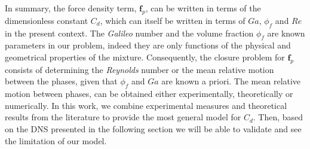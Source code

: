 In summary, the force density term, $\textbf{f}_p$, can be written in terms of the dimensionless constant $C_d$, which can itself be written in terms of $Ga$, $\phi_f$ and $Re$ in the present context. 
The \textit{Galileo} number and the volume fraction $\phi_f$ are known parameters in our problem, indeed they are only functions of the physical and geometrical properties of the mixture.
Consequently, the closure problem for $\textbf{f}_p$ consists of determining the \textit{Reynolds} number or the mean relative motion between the phases, given that $\phi_f$ and $Ga$ are known a priori. 
The mean relative motion between phases, can be obtained either experimentally, theoretically or numerically. 
In this work, we combine experimental measures and theoretical results from the literature to provide the most general model for $C_d$.
Then, based on the DNS presented in the following section we will be able to validate and see the limitation of our model. 
 
